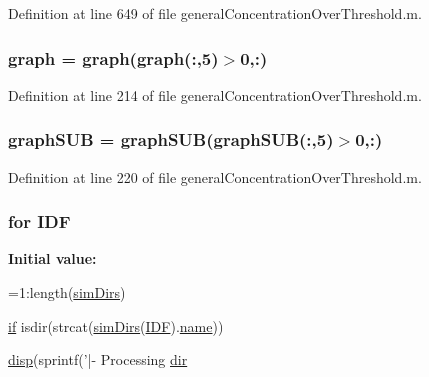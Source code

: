 Definition at line 649 of file general\-Concentration\-Over\-Threshold.\-m.

\hypertarget{a00022_a91819eaefb434ac459f17b3caa03713d}{
\subsubsection[{graph}]{ graph = graph(graph(\-:,5)$>$0,\-:)}}\label{a00022_a91819eaefb434ac459f17b3caa03713d}


Definition at line 214 of file general\-Concentration\-Over\-Threshold.\-m.

\hypertarget{a00022_a0c738fa68cf19f3aeef6b6a7a723577c}{
\subsubsection[{graph\-S\-U\-B}]{ graph\-S\-U\-B = graph\-S\-U\-B(graph\-S\-U\-B(\-:,5)$>$0,\-:)}}\label{a00022_a0c738fa68cf19f3aeef6b6a7a723577c}


Definition at line 220 of file general\-Concentration\-Over\-Threshold.\-m.

\hypertarget{a00022_a8acdc1bee73718b1ffcfc7eb26968f48}{
\subsubsection[{I\-D\-F}]{\setlength{\rightskip}{0pt plus 5cm}for I\-D\-F}}\label{a00022_a8acdc1bee73718b1ffcfc7eb26968f48}
{\bfseries Initial value\-:}
\begin{DoxyCode}
=1:length(\hyperlink{a00021_aae5035eb84b89176ed5b06e136325eff}{simDirs})
    
    \hyperlink{a00019_adf3394dfd4755fd0ef2854fe558ff8aa}{if} isdir(strcat(\hyperlink{a00021_aae5035eb84b89176ed5b06e136325eff}{simDirs}(\hyperlink{a00022_a8acdc1bee73718b1ffcfc7eb26968f48}{IDF}).\hyperlink{a00021_abbf559a76fab59203496b0847ab9502a}{name}))
        
        \hyperlink{a00017_a9be64ccaf83f215ee184d5aafefd7352}{disp}(sprintf('|- Processing \hyperlink{a00065_a4ca269cf93df1b512b52174c1a256fe5}{dir} %
\end{DoxyCode}


